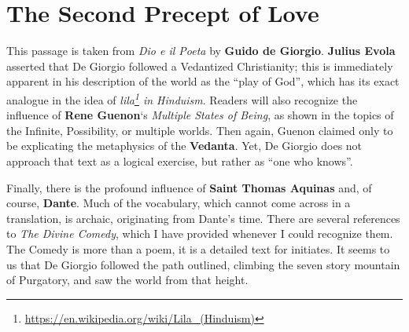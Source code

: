 \section{The Second Precept of Love}

\begin{quotationx}
This passage is taken from \emph{Dio e il Poeta} by \textbf{Guido de Giorgio}. \textbf{Julius Evola} asserted that De Giorgio followed a Vedantized Christianity; this is immediately apparent in his description of the world as the ``play of God'', which has its exact analogue in the idea of \emph{lila\footnote{\url{https://en.wikipedia.org/wiki/Lila\_(Hinduism)}} in Hinduism}. Readers will also recognize the influence of \textbf{Rene Guenon}`s \emph{Multiple States of Being}, as shown in the topics of the Infinite, Possibility, or multiple worlds. Then again, Guenon claimed only to be explicating the metaphysics of the \textbf{Vedanta}. Yet, De Giorgio does not approach that text as a logical exercise, but rather as ``one who knows''.

Finally, there is the profound influence of \textbf{Saint Thomas Aquinas} and, of course, \textbf{Dante}. Much of the vocabulary, which cannot come across in a translation, is archaic, originating from Dante's time. There are several references to \emph{The Divine Comedy}, which I have provided whenever I could recognize them. The Comedy is more than a poem, it is a detailed text for initiates. It seems to us that De Giorgio followed the path outlined, climbing the seven story mountain of Purgatory, and saw the world from that height.
\end{quotationx}


